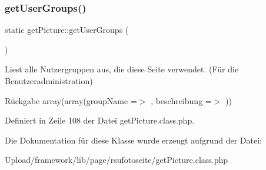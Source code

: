 \subsubsection{\texorpdfstring{get\+User\+Groups()}{getUserGroups()}}
{\footnotesize\ttfamily static get\+Picture\+::get\+User\+Groups (\begin{DoxyParamCaption}{ }\end{DoxyParamCaption})\hspace{0.3cm}{\ttfamily [static]}}

Liest alle Nutzergruppen aus, die diese Seite verwendet. (Für die Benutzeradministration) \begin{DoxyReturn}{Rückgabe}
array(array(\textquotesingle{}group\+Name\textquotesingle{} =$>$ \textquotesingle{}\textquotesingle{}, \textquotesingle{}beschreibung\textquotesingle{} =$>$ \textquotesingle{}\textquotesingle{})) 
\end{DoxyReturn}


Definiert in Zeile 108 der Datei get\+Picture.\+class.\+php.



Die Dokumentation für diese Klasse wurde erzeugt aufgrund der Datei\+:\begin{DoxyCompactItemize}
\item 
Upload/framework/lib/page/rsufotoseite/get\+Picture.\+class.\+php\end{DoxyCompactItemize}
